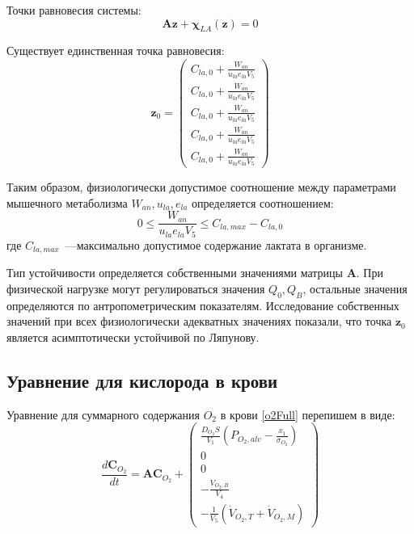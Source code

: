 Точки равновесия системы:
\begin{equation}
\textbf{A}\textbf{z}+\mathbf{\chi}_{LA}(\textbf{z})=0
\end{equation}

Существует единственная точка равновесия:
\begin{equation}
\mathbf{z}_{0} = \begin{pmatrix}
C_{la,0}+ \frac{W_{an}}{u_{la}e_{la}V_{5}} \\
C_{la,0}+ \frac{W_{an}}{u_{la}e_{la}V_{5}} \\
C_{la,0}+  \frac{W_{an}}{u_{la}e_{la}V_{5}} \\
C_{la,0}+  \frac{W_{an}}{u_{la}e_{la}V_{5}} \\
C_{la,0}+  \frac{W_{an}}{u_{la}e_{la}V_{5}}
\end{pmatrix}
\end{equation}

Таким образом, физиологически допустимое соотношение между параметрами мышечного метаболизма \(W_{an}, u_{la}, e_{la}\) определяется соотношением:
\begin{equation}
0 \le \displaystyle \frac{W_{an}}{u_{la}e_{la}V_{5}} \le C_{la,max}-C_{la,0}
\end{equation}
где \(C_{la,max}\)~---максимально допустимое содержание лактата в организме.

Тип устойчивости определяется собственными значениями матрицы \(\mathbf{A}\). При физической нагрузке могут регулироваться значения \(Q_{0}, Q_{B}\), остальные значения определяются по антропометрическим показателям. Исследование собственных значений при всех физиологически адекватных значениях показали, что точка \(\mathbf{z}_{0}\) является асимптотически устойчивой по Ляпунову.

\subsection{Уравнение для кислорода в крови}
Уравнение для суммарного содержания \(O_{2}\) в крови \eqref{o2Full} перепишем в виде:
\begin{equation}
\displaystyle \frac{d\mathbf{C}_{O_{2}}}{dt}
=\mathbf{A} \mathbf{C}_{O_{2}}+\begin{pmatrix}
\displaystyle \frac{D_{O_{2}}S}{V_{1}}\left(P_{O_{2},alv}-\frac{x_{1}}{\sigma_{O_{2}}} \right) \\
0 \\
0 \\
\displaystyle -\frac{\dot{V}_{O_{2},B}}{V_{4}} \\
\displaystyle  -\frac{1}{V_{5}}\left(\dot{V}_{O_{2},T}+\dot{V}_{O_{2},M}\right)
\end{pmatrix}
\end{equation}

